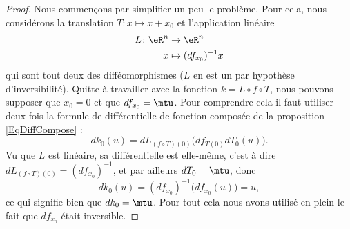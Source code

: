 \begin{proof}
    Nous commençons par simplifier un peu le problème. Pour cela, nous considérons la translation \( T\colon x\mapsto x+x_0 \) et l'application linéaire
    \begin{equation}
        \begin{aligned}
            L\colon \eR^n&\to \eR^n \\
            x&\mapsto (df_{x_0})^{-1}x
        \end{aligned}
    \end{equation}
    qui sont tout deux des difféomorphismes (\( L\) en est un par hypothèse d'inversibilité). Quitte à travailler avec la fonction \( k=L\circ f\circ T\), nous pouvons supposer que \( x_0=0\) et que \( df_{x_0}=\mtu\). Pour comprendre cela il faut utiliser deux fois la formule de différentielle de fonction composée de la proposition \ref{EqDiffCompose} :
    \begin{equation}
        dk_0(u)=dL_{(f\circ T)(0)}\Big( df_{T(0)}dT_0(u) \Big).
    \end{equation}
    Vu que \( L\) est linéaire, sa différentielle est elle-même, c'est à dire \( dL_{(f\circ T)(0)}=(df_{x_0})^{-1}\), et par ailleurs \( dT_0=\mtu\), donc
    \begin{equation}
        dk_0(u)=(df_{x_0})^{-1}\Big( df_{x_0}(u) \Big)=u,
    \end{equation}
    ce qui signifie bien que \( dk_0=\mtu\). Pour tout cela nous avons utilisé en plein le fait que \( df_{x_0}\) était inversible.


\end{proof}
